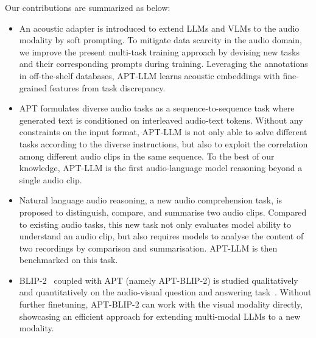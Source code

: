 \documentclass{article} %
\begin{document}
Our contributions are summarized as below:
\begin{itemize}
    \item An acoustic adapter is introduced to extend LLMs and VLMs to the audio modality by soft prompting. To mitigate data scarcity in the audio domain, we improve the present multi-task training approach by devising new tasks and their corresponding prompts during training. Leveraging the annotations in off-the-shelf databases, APT-LLM learns acoustic embeddings with fine-grained features from task discrepancy.
    
    \item APT formulates diverse audio tasks as a sequence-to-sequence task where generated text is conditioned on interleaved audio-text tokens. Without any constraints on the input format, APT-LLM is not only able to solve different tasks according to the diverse instructions, but also to exploit the correlation among different audio clips in the same sequence. To the best of our knowledge, APT-LLM is the first audio-language model reasoning beyond a single audio clip.
    
    \item Natural language audio reasoning, a new audio comprehension task, is proposed to distinguish, compare, and summarise two audio clips. Compared to existing audio tasks, this new task not only evaluates model ability to understand an audio clip, but also requires models to analyse the content of two recordings by comparison and summarisation. APT-LLM is then benchmarked on this task.
    
    \item BLIP-2~\citep{li_blip-2_2023} coupled with APT (namely APT-BLIP-2) is studied qualitatively and quantitatively on the audio-visual question and answering task~\citep{yang_avqa_2022}. Without further finetuning, APT-BLIP-2 can work with the visual modality directly, showcasing an efficient approach for extending multi-modal LLMs to a new modality.

\end{itemize}
\end{document}
